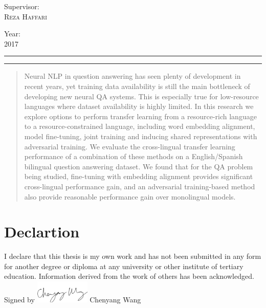 \documentclass[]{article}
\begin{document}
\begin{titlepage}
	{Supervisor:}\\
	\vspace{0.01\textheight}
	{\Large \textsc{Reza Haffari}} %
	\vspace{0.05\textheight}
	
	{Year:}\\
	\vspace{0.01\textheight}
	{\Large \textsc{2017}}
	
	\vfill %
	
	
	\rule{\textwidth}{0.4pt} %
	
	\vspace{2pt}\vspace{-\baselineskip} %
	
	\rule{\textwidth}{1pt} %
	
\end{titlepage}

\newpage
\begin{abstract}
Neural NLP in question answering has seen plenty of development in recent years, yet training data availability is still the main bottleneck of developing new neural QA systems. This is especially true for low-resource languages where dataset availability is highly limited. In this research we explore options to perform transfer learning from a resource-rich language to a resource-constrained language, including word embedding alignment, model fine-tuning, joint training and inducing shared representations with adversarial training. We evaluate the cross-lingual transfer learning performance of a combination of these methods on a English/Spanish bilingual question answering dataset. We found that for the QA problem being studied, fine-tuning with embedding alignment provides significant cross-lingual performance gain, and an adversarial training-based method also provide reasonable performance gain over monolingual models.
\end{abstract}

\newpage
\section*{Declartion}
I declare that this thesis is my own work and has not been submitted in any form for another degree or diploma at any university or other institute of tertiary education. Information derived from the work of others has been acknowledged.
\newline\newline\newline
Signed by \space \includegraphics[width=7em]{media/sig.png}
\newline\newline\newline
Chenyang Wang
\newline
\date{11/09/2017}
\end{document}

